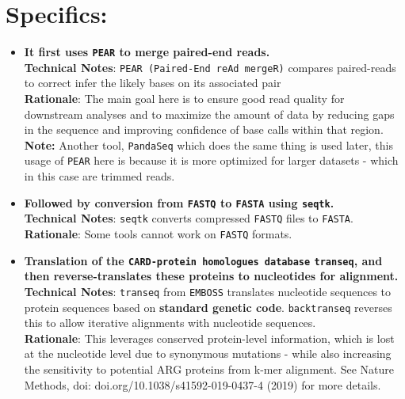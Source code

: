 \documentclass[11pt]{report}
\begin{document}
\section*{Specifics:}
\begin{itemize}
	\subsection*{Preprocessing}
	\item \textbf{It first uses \texttt{PEAR} to merge paired-end reads.}\\
	\textbf{Technical Notes}: \texttt{PEAR (Paired-End reAd mergeR)} compares paired-reads to correct infer the likely  bases on its associated pair\\
	\textbf{Rationale}: The main goal here is to ensure good read quality for downstream analyses and to maximize the amount of data by reducing gaps in the sequence and improving confidence of base calls within that region.\\
	\textbf{Note:} Another tool, \texttt{PandaSeq} which does the same thing is used later, this usage of \texttt{PEAR} here is because it is more optimized for larger datasets - which in this case are trimmed reads.
	
	\item \textbf{Followed by conversion from \texttt{FASTQ} to \texttt{FASTA} using \texttt{seqtk}.}\\
	\textbf{Technical Notes}: \texttt{seqtk} converts compressed \texttt{FASTQ} files to \texttt{FASTA}. \\
	\textbf{Rationale}: Some tools cannot work on \texttt{FASTQ} formats.
	
	\item \textbf{Translation of the \texttt{CARD-protein homologues database} \texttt{transeq}, and then reverse-translates these proteins to nucleotides for alignment.}\\
	\textbf{Technical Notes}: \texttt{transeq} from \texttt{EMBOSS} translates nucleotide sequences to protein sequences based on \textbf{standard genetic code}. \texttt{backtranseq} reverses this to allow iterative alignments with nucleotide sequences. \\
	\textbf{Rationale}: This leverages conserved protein-level information, which is lost at the nucleotide level due to synonymous mutations - while also increasing the sensitivity to potential ARG proteins from k-mer alignment. See Nature Methods, doi: doi.org/10.1038/s41592-019-0437-4 (2019) for more details.
	

\end{itemize}
\end{document}
